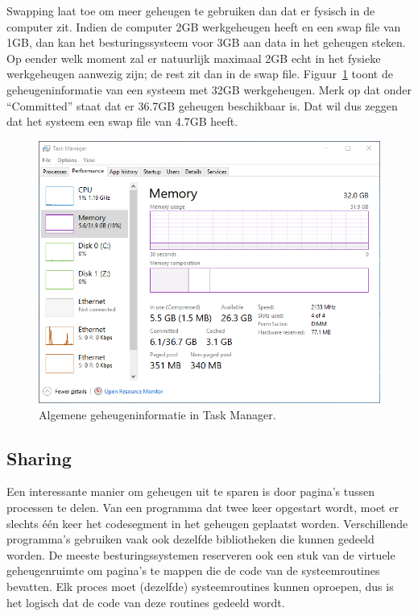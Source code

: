 Swapping laat toe om meer geheugen te gebruiken dan dat er fysisch in de computer zit. Indien de computer 2GB werkgeheugen heeft en een swap file van 1GB, dan kan het besturingssysteem voor 3GB aan data in het geheugen steken. Op eender welk moment zal er natuurlijk maximaal 2GB echt in het fysieke werkgeheugen aanwezig zijn; de rest zit dan in de swap file. Figuur~\ref{taskmgr_mem} toont de geheugeninformatie van een systeem met 32GB werkgeheugen. Merk op dat onder ``Committed'' staat dat er 36.7GB geheugen beschikbaar is. Dat wil dus zeggen dat het systeem een swap file van 4.7GB heeft.

\begin{figure}
\begin{center}
\includegraphics[width=1.0\textwidth]{images/taskmgr_mem.png}
\end{center}
\caption{Algemene geheugeninformatie in Task Manager.}
\label{taskmgr_mem}
\end{figure}

\subsection{Sharing}

Een interessante manier om geheugen uit te sparen is door pagina's tussen processen te delen. Van een programma dat twee keer opgestart wordt, moet er slechts \'e\'en keer het codesegment in het geheugen geplaatst worden. Verschillende programma's gebruiken vaak ook dezelfde bibliotheken die kunnen gedeeld worden. De meeste besturingssystemen reserveren ook een stuk van de virtuele geheugenruimte om pagina's te mappen die de code van de systeemroutines bevatten. Elk proces moet (dezelfde) systeemroutines kunnen oproepen, dus is het logisch dat de code van deze routines gedeeld wordt.


